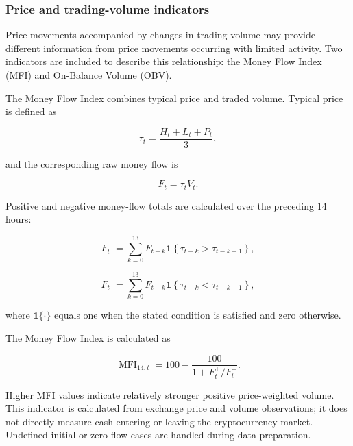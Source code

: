 \subsubsection{Price and trading-volume indicators}

Price movements accompanied by changes in trading volume may provide different information from price movements occurring with limited activity. Two indicators are included to describe this relationship: the Money Flow Index (MFI) and On-Balance Volume (OBV).

The Money Flow Index combines typical price and traded volume. Typical price is defined as

\begin{equation}
\tau_t
=
\frac{H_t+L_t+P_t}{3},
\label{eq:typical_price}
\end{equation}

and the corresponding raw money flow is

\begin{equation}
F_t=\tau_tV_t.
\label{eq:money_flow}
\end{equation}

Positive and negative money-flow totals are calculated over the preceding 14 hours:

\begin{equation}
F_t^{+}
=
\sum_{k=0}^{13}
F_{t-k}
\mathbf{1}
\left\{
\tau_{t-k}>\tau_{t-k-1}
\right\},
\label{eq:positive_flow}
\end{equation}

\begin{equation}
F_t^{-}
=
\sum_{k=0}^{13}
F_{t-k}
\mathbf{1}
\left\{
\tau_{t-k}<\tau_{t-k-1}
\right\},
\label{eq:negative_flow}
\end{equation}

where $\mathbf{1}\{\cdot\}$ equals one when the stated condition is satisfied and zero otherwise.

The Money Flow Index is calculated as

\begin{equation}
\operatorname{MFI}_{14,t}
=
100-
\frac{100}{
1+F_t^{+}/F_t^{-}
}.
\label{eq:mfi}
\end{equation}

Higher MFI values indicate relatively stronger positive price-weighted volume. This indicator is calculated from exchange price and volume observations; it does not directly measure cash entering or leaving the cryptocurrency market. Undefined initial or zero-flow cases are handled during data preparation.

